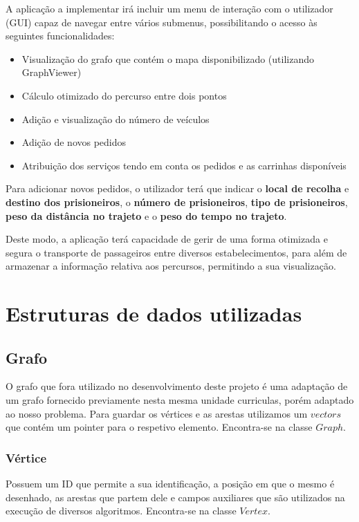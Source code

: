 \documentclass[article, a4paper, 12pt, oneside]{memoir}
\begin{document}
A aplicação a implementar irá incluir um menu de interação com o utilizador (GUI) capaz de navegar entre vários submenus, possibilitando o acesso às seguintes funcionalidades:

\begin{itemize}
	\item Visualização do grafo que contém o mapa disponibilizado (utilizando GraphViewer)
	\item Cálculo otimizado do percurso entre dois pontos
	\item Adição e visualização do número de veículos
	\item Adição de novos pedidos
	\item Atribuição dos serviços tendo em conta os pedidos e as carrinhas disponíveis
\end{itemize}

Para adicionar novos pedidos, o utilizador terá que indicar o \textbf{local de recolha} e \textbf{destino dos prisioneiros}, o \textbf{número de prisioneiros}, \textbf{tipo de prisioneiros}, \textbf{peso da distância no trajeto} e o \textbf{peso do tempo no trajeto}.

Deste modo, a aplicação terá capacidade de gerir de uma forma otimizada e segura o transporte de passageiros entre diversos estabelecimentos, para além de armazenar a informação relativa aos percursos, permitindo a sua visualização.

\newpage
\chapter[Estruturas de dados utilizadas][Estruturas de dados utilizadas]{Estruturas de dados utilizadas} \label{\thechapter}

\section{Grafo}
O grafo que fora utilizado no desenvolvimento deste projeto é uma adaptação de um grafo fornecido previamente nesta mesma unidade curriculas, porém adaptado ao nosso problema. Para guardar os vértices e as 
arestas utilizamos um $vectors$ que contém um pointer para o respetivo elemento. Encontra-se na classe $Graph$.

\subsection{Vértice}
Possuem um ID que permite a sua identificação, a posição em que o mesmo é desenhado, as arestas que partem dele e campos auxiliares que são utilizados
na execução de diversos algoritmos. Encontra-se na classe $Vertex$.
\end{document}
